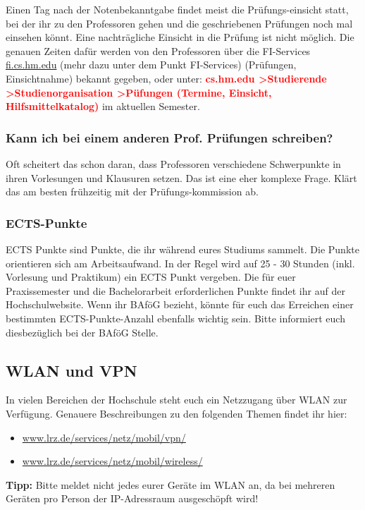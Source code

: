 Einen Tag nach der Notenbekanntgabe findet meist die Prüfungs-einsicht statt, bei der ihr zu den Professoren gehen und die geschriebenen Prüfungen noch mal einsehen könnt. Eine nachträgliche Einsicht in die Prüfung ist nicht möglich. Die genauen Zeiten dafür werden von den Professoren über die FI-Services \url{fi.cs.hm.edu} (mehr dazu unter dem Punkt FI-Services) (Prüfungen, Einsichtnahme) bekannt gegeben, oder unter:\doublebreak
\textcolor{red}{\textbf{cs.hm.edu \textgreater Studierende \textgreater Studienorganisation \textgreater Püfungen (Termine, Einsicht, Hilfsmittelkatalog)}} im aktuellen Semester.

\subsubsection{Kann ich bei einem anderen Prof. Prüfungen schreiben?}

Oft scheitert das schon daran, dass Professoren verschiedene Schwerpunkte in ihren Vorlesungen und Klausuren setzen. Das ist eine eher komplexe Frage. Klärt das am besten frühzeitig mit der Prüfungs-kommission ab.

\subsubsection{ECTS-Punkte}

ECTS Punkte sind Punkte, die ihr während eures Studiums sammelt. Die Punkte orientieren sich am Arbeitsaufwand. In der Regel wird auf 25 - 30 Stunden (inkl. Vorlesung und Praktikum) ein ECTS Punkt vergeben. Die für euer Praxissemester und die Bachelorarbeit erforderlichen Punkte findet ihr auf der Hochschulwebsite.\doublebreak
Wenn ihr BAföG bezieht, könnte für euch das Erreichen einer bestimmten ECTS-Punkte-Anzahl ebenfalls wichtig sein. Bitte informiert euch diesbezüglich bei der BAföG Stelle.

\subsection{WLAN und VPN}

In vielen Bereichen der Hochschule steht euch ein Netzzugang über WLAN zur Verfügung. Genauere Beschreibungen zu den folgenden Themen findet ihr hier:

\begin{itemize}
	\item{\url{www.lrz.de/services/netz/mobil/vpn/}}
	\item{\url{www.lrz.de/services/netz/mobil/wireless/}}
\end{itemize}
\textbf{Tipp:} Bitte meldet nicht jedes eurer Geräte im WLAN an, da bei mehreren Geräten pro Person der IP-Adressraum ausgeschöpft wird!

